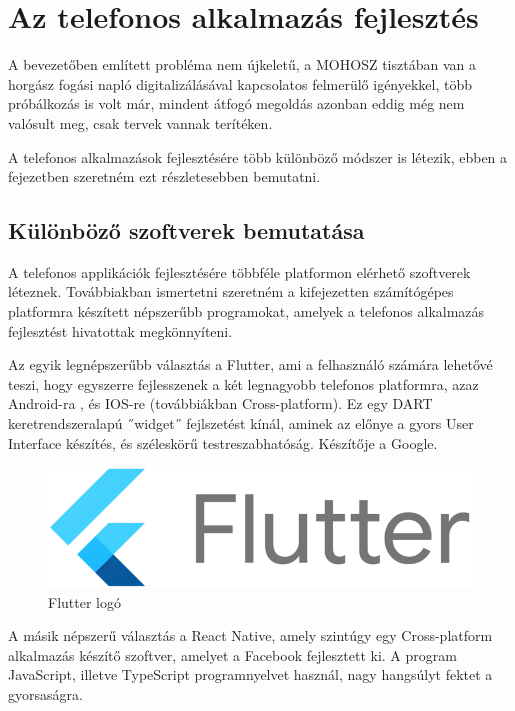 \chapter{Az telefonos alkalmazás fejlesztés}

A bevezetőben említett probléma nem újkeletű, a MOHOSZ tisztában van a horgász fogási napló digitalizálásával
kapcsolatos felmerülő igényekkel, több próbálkozás is volt már, mindent átfogó megoldás azonban eddig még nem valósult meg, csak tervek vannak terítéken\cite{Mohosz}.

A telefonos alkalmazások fejlesztésére több különböző módszer is létezik, ebben a fejezetben szeretném
ezt részletesebben bemutatni.

\section{Különböző szoftverek bemutatása}

A telefonos applikációk fejlesztésére többféle platformon elérhető szoftverek léteznek.
Továbbiakban ismertetni szeretném a kifejezetten számítógépes platformra készített népszerűbb programokat,
amelyek a telefonos alkalmazás fejlesztést hivatottak megkönnyíteni.
\vspace{.5cm}

Az egyik legnépszerűbb választás a Flutter, ami a felhasználó számára lehetővé teszi, hogy egyszerre
fejlesszenek a két legnagyobb telefonos platformra, azaz Android-ra , és IOS-re (továbbiákban Cross-platform).
Ez egy DART keretrendszeralapú ˝widget˝ fejlszetést kínál, aminek az előnye a gyors User Interface készítés,
és széleskörű testreszabhatóság\cite{Flutter}. Készítője a Google.

\begin{figure}[h]
\centering
\includegraphics[scale=0.2]{images/flutter.png}
\caption{Flutter logó}
\label{fig:flutter}
\end{figure}

A másik népszerű választás a React Native\cite{React}, amely szintúgy egy Cross-platform alkalmazás készítő szoftver,
amelyet a Facebook fejlesztett ki. A program JavaScript, illetve TypeScript programnyelvet használ,
nagy hangsúlyt fektet a gyorsaságra.

